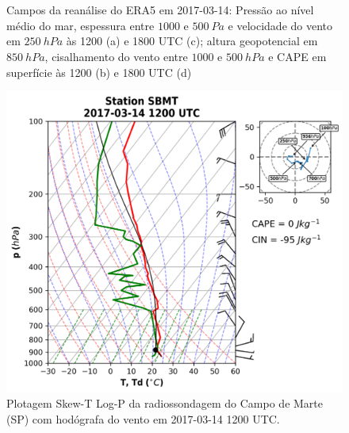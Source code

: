 \begin{figure}[htb]
	\begin{center}
		\caption{Campos da reanálise do ERA5 em 2017-03-14: Pressão ao nível médio do mar, espessura entre $1000$ e $500\:Pa$ e velocidade do vento em $250\:hPa$ às 1200 (a) e 1800 UTC (c); altura geopotencial em $850\:hPa$, cisalhamento do vento entre $1000$ e $500\:hPa$ e CAPE em superfície às 1200 (b) e 1800 UTC (d)} 
		\label{era5_20170314_main}
		 \\
		 \\
	\end{center}
\end{figure}

\begin{figure}[htb]
	\begin{center}
		\caption{Plotagem Skew-T Log-P da radiossondagem do Campo de Marte (SP) com hodógrafa do vento em 2017-03-14 1200 UTC.} 
		\label{sondagem_20170314}
		\includegraphics[width=0.9\columnwidth]{../Sounding_Processing/figures/sounding_SBMT2017031412UTC.png}
	\end{center}
\end{figure}

